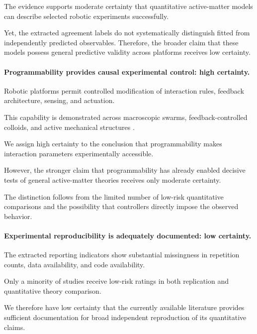 The evidence supports
moderate certainty
that quantitative
active-matter models
can describe selected
robotic experiments
successfully.

Yet, the extracted
agreement labels do
not systematically
distinguish fitted
from independently
predicted observables.
Therefore, the broader
claim that these
models possess
general predictive
validity across
platforms receives
low certainty.

\paragraph*{Programmability provides causal experimental control:
high certainty.}

Robotic platforms permit
controlled modification
of interaction rules,
feedback architecture,
sensing, and actuation.

This capability is
demonstrated across
macroscopic swarms,
feedback-controlled
colloids, and active
mechanical structures
\cite{Ferrante2013aselfadaptivecomm,Li2019particleroboticsba,Buerle2020formationofstable,Chen2022collectiveresponse,Fruchart2022nonreciprocalphase,Heuthe2025tunablecolloidalsw,Brandenbourger2021limitcyclesturnac,Coulais2025activemetamaterials}.

We assign high certainty
to the conclusion
that programmability
makes interaction
parameters experimentally
accessible.

However, the stronger
claim that programmability
has already enabled
decisive tests of
general active-matter
theories receives
only moderate certainty.

The distinction follows
from the limited
number of low-risk
quantitative comparisons
and the possibility
that controllers
directly impose
the observed behavior.

\paragraph*{Experimental reproducibility is adequately documented:
low certainty.}

The extracted reporting indicators
show substantial missingness
in repetition counts,
data availability,
and code availability.

Only a minority of
studies receive
low-risk ratings
in both replication
and quantitative
theory comparison.

We therefore have
low certainty that
the currently
available literature
provides sufficient
documentation for
broad independent
reproduction of
its quantitative
claims.

